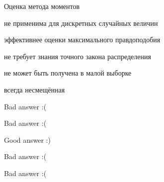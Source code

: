 
\begin{question}
Оценка метода моментов
\begin{answerlist}
  \item не применима для дискретных случайных величин
  \item эффективнее оценки максимального правдоподобия
  \item не требует знания точного закона распределения
  \item не может быть получена в малой выборке
  \item всегда несмещённая
\end{answerlist}
\end{question}

\begin{solution}
\begin{answerlist}
  \item Bad answer :(
  \item Bad answer :(
  \item Good answer :)
  \item Bad answer :(
  \item Bad answer :(
\end{answerlist}
\end{solution}

